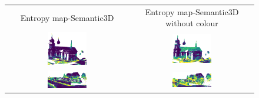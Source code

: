     \begin{figure}[h!]
        \centering
        \begin{tabular}{cc}
            Entropy map-Semantic3D & Entropy map-Semantic3D without colour \\
            \includegraphics[width=0.33\textwidth, height=0.18\textheight]{images/ood_imgs/fout_sem3d/fout_ent_1.pdf}&
            \includegraphics[width=0.33\textwidth, height=0.18\textheight]{images/sem3d_of/fout_ent_sem3d_of_1.pdf}\\

            \includegraphics[width=0.33\textwidth, height=0.18\textheight]{images/ood_imgs/fout_sem3d/fout_ent_2.pdf}&
            \includegraphics[width=0.33\textwidth, height=0.18\textheight]{images/sem3d_of/fout_ent_sem3d_of_2.pdf}\\


\end{tabular}
\end{figure}
